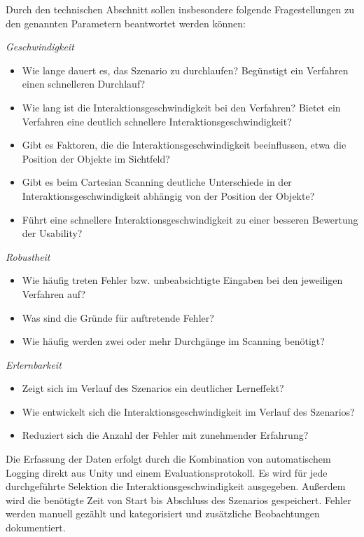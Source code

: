 Durch den technischen Abschnitt sollen insbesondere folgende Fragestellungen zu den genannten Parametern beantwortet werden können:


\textit{Geschwindigkeit} 
    \begin{itemize}
        \item Wie lange dauert es, das Szenario zu durchlaufen? Begünstigt ein Verfahren einen schnelleren Durchlauf?
        \item Wie lang ist die Interaktionsgeschwindigkeit bei den Verfahren? Bietet ein Verfahren eine deutlich schnellere Interaktionsgeschwindigkeit?
        \item Gibt es Faktoren, die die Interaktionsgeschwindigkeit beeinflussen, etwa die Position der Objekte im Sichtfeld?
        \item Gibt es beim Cartesian Scanning deutliche Unterschiede in der Interaktionsgeschwindigkeit abhängig von der Position der Objekte?
        \item Führt eine schnellere Interaktionsgeschwindigkeit zu einer besseren Bewertung der Usability? 
    \end{itemize}
\textit{Robustheit}
    \begin{itemize}
        \item  Wie häufig treten Fehler bzw. unbeabsichtigte Eingaben bei den jeweiligen Verfahren auf? 
        \item Was sind die Gründe für auftretende Fehler?
        \item Wie häufig werden zwei oder mehr Durchgänge im Scanning benötigt?
    \end{itemize}
\textit{Erlernbarkeit}
    \begin{itemize}
        \item Zeigt sich im Verlauf des Szenarios ein deutlicher Lerneffekt? 
        \item Wie entwickelt sich die Interaktionsgeschwindigkeit im Verlauf des Szenarios? 
        \item Reduziert sich die Anzahl der Fehler mit zunehmender Erfahrung?
    \end{itemize}


Die Erfassung der Daten erfolgt durch die Kombination von automatischem Logging direkt aus Unity und einem Evaluationsprotokoll. Es wird für jede durchgeführte Selektion die Interaktionsgeschwindigkeit ausgegeben. Außerdem wird die benötigte Zeit von Start bis Abschluss des Szenarios gespeichert. Fehler werden manuell gezählt und kategorisiert und  zusätzliche Beobachtungen dokumentiert. 


